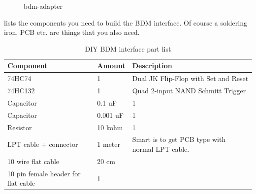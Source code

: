 \documentclass[11pt,a4paper]{book}
\newcommand{\Mfig}[1]{%
\begin{figure}
    \centering
    \missingfigure{#1}
    \caption{#1}
\end{figure}}
\begin{document}
\Mfig{bdm-adapter}

 lists the components you need to build the BDM interface. Of course a soldering
iron, PCB etc. are things that you also need.

\begin{table}
    \centering
    \begin{tabular}{lll}
        Component & Amount & Description \\
        \midrule
        74HC74 & 1 & Dual JK Flip-Flop with Set and Reset \\
        74HC132 & 1&  Quad 2-input NAND Schmitt Trigger \\
        Capacitor &0.1 uF& 1 \\
        Capacitor &0.001 uF& 1 \\
        Resistor &10 kohm & 1 \\
        LPT cable + connector &1 meter& Smart is to get PCB type with normal LPT cable.
        \\
        10 wire flat cable &20 cm  & \\
        10 pin female header for flat cable & 1
    \end{tabular}
    \caption{DIY BDM interface part list}
    \label{tab:bdm-part-list}
\end{table}
\end{document}
